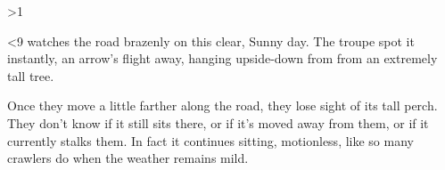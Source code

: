 \ifnum\value{temperature}>1

  \ifnum\value{fenestraDay}<9
   watches the road brazenly on this clear, Sunny day.
  The troupe spot it instantly, an arrow's flight away, hanging upside-down from from an extremely tall tree.
  
  \chitincrawler
  \label{crawlerStatblock}
  
  Once they move a little farther along the road, they lose sight of its tall perch.
  They don't know if it still sits there, or if it's moved away from them, or if it currently stalks them.
  In fact it continues sitting, motionless, like so many \glspl{crawler} do when the weather remains mild.
  
  \fi
\fi
